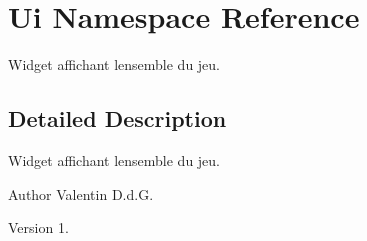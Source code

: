 \hypertarget{namespace_ui}{}\section{Ui Namespace Reference}
\label{namespace_ui}


Widget affichant l\textquotesingle{}ensemble du jeu.  




\subsection{Detailed Description}
Widget affichant l\textquotesingle{}ensemble du jeu. 

\begin{DoxyAuthor}{Author}
Valentin D.\+d.\+G. 
\end{DoxyAuthor}
\begin{DoxyVersion}{Version}
1. 
\end{DoxyVersion}
